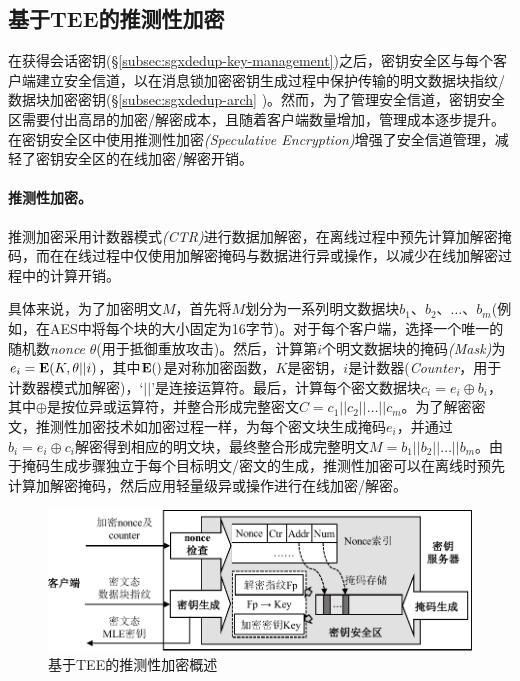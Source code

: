 \subsection{基于TEE的推测性加密}
\label{subsec:sgxdedup-encryption}

在获得会话密钥(\S\ref{subsec:sgxdedup-key-management})之后，密钥安全区与每个客户端建立安全信道，以在消息锁加密密钥生成过程中保护传输的明文数据块指纹/数据块加密密钥(\S\ref{subsec:sgxdedup-arch} )。然而，为了管理安全信道，密钥安全区需要付出高昂的加密/解密成本，且随着客户端数量增加，管理成本逐步提升。\sysnameS 在密钥安全区中使用推测性加密\textit{(Speculative Encryption)}增强了安全信道管理，减轻了密钥安全区的在线加密/解密开销。

\paragraph*{推测性加密。}推测加密采用计数器模式\textit{(CTR)}进行数据加解密，在离线过程中预先计算加解密掩码，而在在线过程中仅使用加解密掩码与数据进行异或操作，以减少在线加解密过程中的计算开销。

具体来说，为了加密明文$M$，首先将$M$划分为一系列明文数据块$b_1、b_2、\ldots、b_m$(例如，在AES中将每个块的大小固定为16字节)。对于每个客户端，选择一个唯一的随机数\textit{nonce} $\theta$(用于抵御重放攻击)。然后，计算第$i$个明文数据块的掩码\textit{(Mask)}为$e_i = {\bf E}(K, \theta || i)$，其中${\bf E}()$是对称加密函数，$K$是密钥，$i$是计数器(\textit{Counter}，用于计数器模式加解密)，‘$||$’是连接运算符。最后，计算每个密文数据块$c_i = e_i \oplus b_i $，其中$\oplus$是按位异或运算符，并整合形成完整密文$C = c_1 || c_2 || \ldots || c_m$。为了解密密文，推测性加密技术如加密过程一样，为每个密文块生成掩码$e_i$，并通过$b_i = e_i \oplus c_i $解密得到相应的明文块，最终整合形成完整明文$M = b_1 || b_2 || \ldots || b_m$。由于掩码生成步骤独立于每个目标明文/密文的生成，推测性加密可以在离线时预先计算加解密掩码，然后应用轻量级异或操作进行在线加密/解密。

\begin{figure}[!htb]
  \centering
  \includegraphics[width=\textwidth]{pic/sgxdedup/key-enclave-arch.pdf}
  \caption{基于TEE的推测性加密概述}
  \label{fig:sgxdedup-SpecEnc}
\end{figure}

